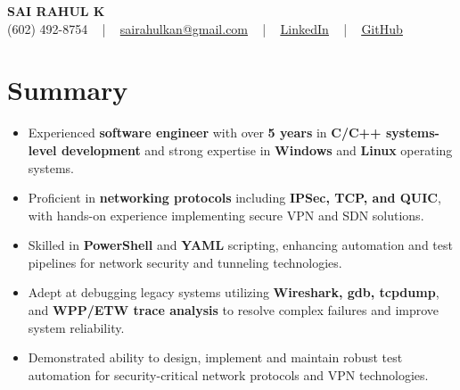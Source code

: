\documentclass[letterpaper,11pt]{article}
\newcommand{\resumeItem}[1]{
  \item\footnotesize{
    {#1 \vspace{-2pt}}
  }
}
\newcommand{\resumeItemListStart}{\begin{itemize}[leftmargin=*]}
\newcommand{\resumeItemListEnd}{\end{itemize}\vspace{-5pt}}
\begin{document}
\begin{center}
    {\fontsize{14pt}{12pt}\selectfont \textbf{\MakeUppercase{Sai Rahul K}}}\\ \vspace{2pt}
    \fontsize{10pt}{12pt}\selectfont (602) 492-8754 ~ | ~ \href{mailto:sairahulkan@gmail.com}{sairahulkan@gmail.com} ~ | ~
    \href{https://www.linkedin.com/in/rq123/}{\color{blue}\underline{LinkedIn}} ~ | ~
    \href{https://github.com/kanrahuldo}{\color{blue}\underline{GitHub}}~
    \vspace{-8pt}
\end{center}

\section{Summary}
\fontsize{9pt}{10pt}\selectfont
\resumeItemListStart
    \resumeItem{Experienced \textbf{software engineer} with over \textbf{5 years} in \textbf{C/C++ systems-level development} and strong expertise in \textbf{Windows} and \textbf{Linux} operating systems.} \vspace{-3pt}
    \resumeItem{Proficient in \textbf{networking protocols} including \textbf{IPSec, TCP, and QUIC}, with hands-on experience implementing secure VPN and SDN solutions.} \vspace{-3pt}
    \resumeItem{Skilled in \textbf{PowerShell} and \textbf{YAML} scripting, enhancing automation and test pipelines for network security and tunneling technologies.} \vspace{-3pt}
    \resumeItem{Adept at debugging legacy systems utilizing \textbf{Wireshark, gdb, tcpdump}, and \textbf{WPP/ETW trace analysis} to resolve complex failures and improve system reliability.} \vspace{-3pt}
    \resumeItem{Demonstrated ability to design, implement and maintain robust test automation for security-critical network protocols and VPN technologies.} \vspace{-3pt}
\resumeItemListEnd
\vspace{-6pt}
\end{document}

